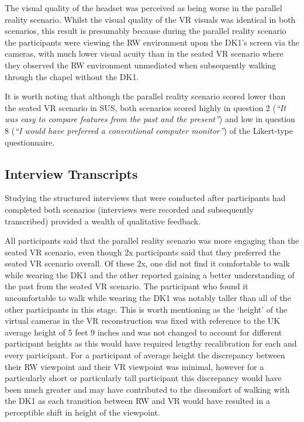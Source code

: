 The visual quality of the headset was perceived as being worse in the parallel reality scenario. Whilst the visual quality of the VR visuals was identical in both scenarios, this result is presumably because during the parallel reality scenario the participants were viewing the RW environment upon the DK1's screen via the cameras, with much lower visual acuity than in the seated VR scenario where they observed the RW environment unmediated when subsequently walking through the chapel without the DK1.

It is worth noting that although the parallel reality scenario scored lower than the seated VR scenario in SUS, both scenarios scored highly in question 2 (\textit{``It was easy to compare features from the past and the present''}) and low in question 8 (\textit{``I would have preferred a conventional computer monitor''}) of the Likert-type questionnaire.


\subsection{Interview Transcripts}
\label{stage1interviews}
Studying the structured interviews that were conducted after participants had completed both scenarios (interviews were recorded and subsequently transcribed) provided a wealth of qualitative feedback.

All participants said that the parallel reality scenario was more engaging than the seated VR scenario, even though 2x participants said that they preferred the seated VR scenario overall. Of these 2x,  one did not find it comfortable to walk while wearing the DK1 and the other reported gaining a better understanding of the past from the seated VR scenario. The participant who found it uncomfortable to walk while wearing the DK1 was notably taller than all of the other participants in this stage. This is worth mentioning as the `height' of the virtual cameras in the VR reconstruction was fixed with reference to the UK average height of 5 feet 9 inches and was not changed to account for different participant heights as this would have required lengthy recalibration for each and every participant. For a participant of average height the discrepancy between their RW viewpoint and their VR viewpoint was minimal, however for a particularly short or particularly tall participant this discrepancy would have been much greater and may have contributed to the discomfort of walking with the DK1 as each transition between RW and VR would have resulted in a perceptible shift in height of the viewpoint.

